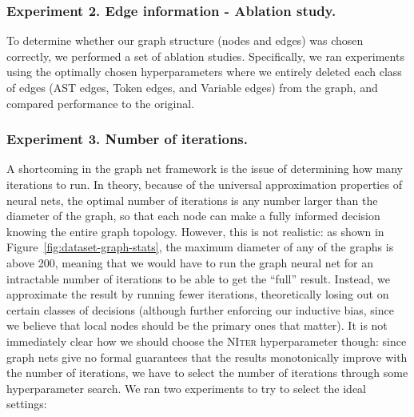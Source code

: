 \subsubsection{Experiment 2. Edge information - Ablation study.}
To determine whether our graph structure (nodes and edges) was chosen correctly, we performed a set of ablation studies.
Specifically, we ran experiments using the optimally chosen hyperparameters where we entirely deleted each class of edges (AST edges, Token edges, and Variable edges) from the graph, and compared performance to the original.

\subsubsection{Experiment 3. Number of iterations.}
A shortcoming in the graph net framework is the issue of determining how many iterations to run.
In theory, because of the universal approximation properties of neural nets, the optimal number of iterations is any number larger than the diameter of the graph, so that each node can make a fully informed decision knowing the entire graph topology.
However, this is not realistic: as shown in Figure~\ref{fig:dataset-graph-stats}, the maximum diameter of any of the graphs is above 200, meaning that we would have to run the graph neural net for an intractable number of iterations to be able to get the ``full'' result.
Instead, we approximate the result by running fewer iterations, theoretically losing out on certain classes of decisions (although further enforcing our inductive bias, since we believe that local nodes should be the primary ones that matter).
It is not immediately clear how we should choose the \textsc{NIter} hyperparameter though: since graph nets give no formal guarantees that the results monotonically improve with the number of iterations, we have to select the number of iterations through some hyperparameter search.
We ran two experiments to try to select the ideal settings: 
